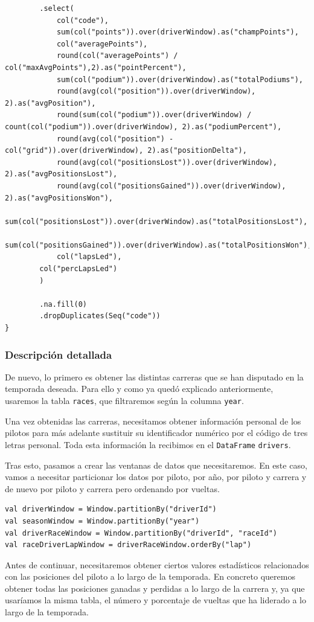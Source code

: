 \documentclass[12pt,twoside,titlepage]{report}
\begin{document}
\begin{lstlisting}
		.select(
			col("code"),
			sum(col("points")).over(driverWindow).as("champPoints"),
			col("averagePoints"),
			round(col("averagePoints") / col("maxAvgPoints"),2).as("pointPercent"),
			sum(col("podium")).over(driverWindow).as("totalPodiums"),        
			round(avg(col("position")).over(driverWindow), 2).as("avgPosition"),
			round(sum(col("podium")).over(driverWindow) / count(col("podium")).over(driverWindow), 2).as("podiumPercent"),
			round(avg(col("position") - col("grid")).over(driverWindow), 2).as("positionDelta"),
			round(avg(col("positionsLost")).over(driverWindow), 2).as("avgPositionsLost"),
			round(avg(col("positionsGained")).over(driverWindow), 2).as("avgPositionsWon"),
			sum(col("positionsLost")).over(driverWindow).as("totalPositionsLost"),
			sum(col("positionsGained")).over(driverWindow).as("totalPositionsWon"),
			col("lapsLed"),
		col("percLapsLed")
		)
	
		.na.fill(0)
		.dropDuplicates(Seq("code"))
}
\end{lstlisting}



\subsubsection{Descripción detallada}

De nuevo, lo primero es obtener las distintas carreras que se han disputado en la temporada deseada. Para ello y como ya quedó explicado anteriormente, usaremos la tabla \texttt{races}, que filtraremos según la columna \texttt{year}.

Una vez obtenidas las carreras, necesitamos obtener información personal de los pilotos para más adelante sustituir su identificador numérico por el código de tres letras personal. Toda esta información la recibimos en el \texttt{DataFrame} \texttt{drivers}.

Tras esto, pasamos a crear las ventanas de datos que necesitaremos. En este caso, vamos a necesitar particionar los datos por piloto, por año, por piloto y carrera y de nuevo por piloto y carrera pero ordenando por vueltas. 

\begin{lstlisting}
val driverWindow = Window.partitionBy("driverId")
val seasonWindow = Window.partitionBy("year")
val driverRaceWindow = Window.partitionBy("driverId", "raceId")
val raceDriverLapWindow = driverRaceWindow.orderBy("lap")
\end{lstlisting}

Antes de continuar, necesitaremos obtener ciertos valores estadísticos relacionados con las posiciones del piloto a lo largo de la temporada. En concreto queremos obtener todas las posiciones ganadas y perdidas a lo largo de la carrera y, ya que usaríamos la misma tabla, el número y porcentaje de vueltas que ha liderado a lo largo de la temporada.
\end{document}
